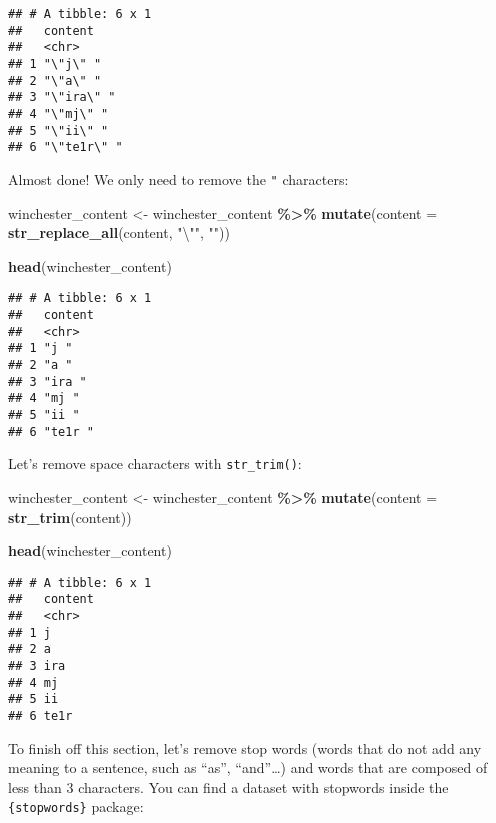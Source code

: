 \documentclass[
]{article}
\newenvironment{Shaded}{\begin{snugshade}}{\end{snugshade}}
\newcommand{\CharTok}[1]{\textcolor[rgb]{0.31,0.60,0.02}{#1}}
\newcommand{\DataTypeTok}[1]{\textcolor[rgb]{0.13,0.29,0.53}{#1}}
\newcommand{\KeywordTok}[1]{\textcolor[rgb]{0.13,0.29,0.53}{\textbf{#1}}}
\newcommand{\NormalTok}[1]{#1}
\newcommand{\OperatorTok}[1]{\textcolor[rgb]{0.81,0.36,0.00}{\textbf{#1}}}
\newcommand{\StringTok}[1]{\textcolor[rgb]{0.31,0.60,0.02}{#1}}
\begin{document}
\begin{verbatim}
## # A tibble: 6 x 1
##   content    
##   <chr>      
## 1 "\"j\" "   
## 2 "\"a\" "   
## 3 "\"ira\" " 
## 4 "\"mj\" "  
## 5 "\"ii\" "  
## 6 "\"te1r\" "
\end{verbatim}

Almost done! We only need to remove the \texttt{"} characters:

\begin{Shaded}
\begin{Highlighting}[]
\NormalTok{winchester\_content \textless{}{-}}\StringTok{ }\NormalTok{winchester\_content }\OperatorTok{\%\textgreater{}\%}\StringTok{ }
\StringTok{  }\KeywordTok{mutate}\NormalTok{(}\DataTypeTok{content =} \KeywordTok{str\_replace\_all}\NormalTok{(content, }\StringTok{"}\CharTok{\textbackslash{}"}\StringTok{"}\NormalTok{, }\StringTok{""}\NormalTok{)) }

\KeywordTok{head}\NormalTok{(winchester\_content)}
\end{Highlighting}
\end{Shaded}

\begin{verbatim}
## # A tibble: 6 x 1
##   content
##   <chr>  
## 1 "j "   
## 2 "a "   
## 3 "ira " 
## 4 "mj "  
## 5 "ii "  
## 6 "te1r "
\end{verbatim}

Let's remove space characters with \texttt{str\_trim()}:

\begin{Shaded}
\begin{Highlighting}[]
\NormalTok{winchester\_content \textless{}{-}}\StringTok{ }\NormalTok{winchester\_content }\OperatorTok{\%\textgreater{}\%}\StringTok{ }
\StringTok{  }\KeywordTok{mutate}\NormalTok{(}\DataTypeTok{content =} \KeywordTok{str\_trim}\NormalTok{(content)) }

\KeywordTok{head}\NormalTok{(winchester\_content)}
\end{Highlighting}
\end{Shaded}

\begin{verbatim}
## # A tibble: 6 x 1
##   content
##   <chr>  
## 1 j      
## 2 a      
## 3 ira    
## 4 mj     
## 5 ii     
## 6 te1r
\end{verbatim}

To finish off this section, let's remove stop words (words that do not add any meaning to a sentence,
such as ``as'', ``and''\ldots) and words that are composed of less than 3 characters. You can find a dataset
with stopwords inside the \texttt{\{stopwords\}} package:
\end{document}
